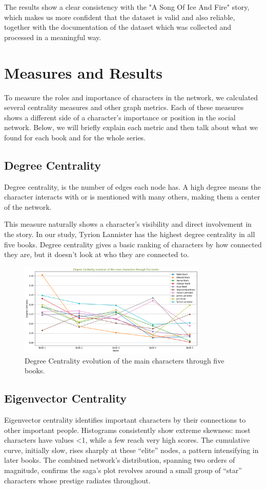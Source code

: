 \documentclass[12pt, a4paper]{article}
\begin{document}
	The results show a clear consistency with the "A Song Of Ice And Fire" story, which makes us more confident that the dataset is valid and also reliable, together with the documentation of the dataset which was collected and processed in a meaningful way.
	
	
	
	\section{Measures and Results}
	\label{measures}
	To measure the roles and importance of characters in the network, we calculated several centrality measures and other graph metrics. Each of these measures shows a different side of a character's importance or position in the social network. Below, we will briefly explain each metric and then talk about what we found for each book and for the whole series.
	
	\subsection*{Degree Centrality}
	Degree centrality, 
	is the number of edges each node has. 
	A high degree means the character interacts with or is
	mentioned with many others, making them a center of the network. 

	This measure naturally shows a character's
	visibility and direct involvement in the story. 
	In our study, Tyrion Lannister has the highest 
	degree centrality in all five books. 
	Degree centrality gives a basic ranking of characters 
	by how connected they are, but it doesn't look at who 
	they are connected to.
	
	\begin{figure}[htbp]
		\centering
		\includegraphics[width=0.8\textwidth]{deg-cent-evolution.png}
		\caption{Degree Centrality evolution of the main characters through five books.}
		\label{fig:deg_cent_evolution}
	\end{figure}
	\FloatBarrier
	\subsection*{Eigenvector Centrality}
	Eigenvector centrality identifies important characters by their connections to other important people. Histograms consistently show extreme skewness: most characters have values <1, while a few reach very high scores. The cumulative curve, initially slow, rises sharply at these ``elite'' nodes, a pattern intensifying in later books. The combined network's distribution, spanning two orders of magnitude, confirms the saga's plot revolves around a small group of ``star'' characters whose prestige radiates throughout.
\end{document}
